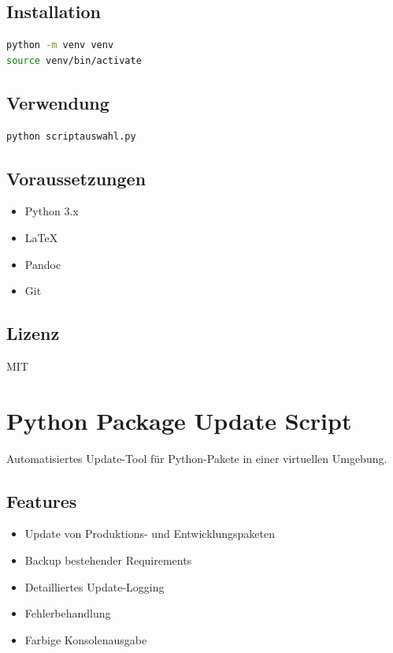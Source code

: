 \documentclass{vorlage-design-main}
\begin{document}
\subsection{Installation}\label{installation}

\begin{lstlisting}[language=bash]
python -m venv venv
source venv/bin/activate
\end{lstlisting}

\subsection{Verwendung}\label{verwendung}

\begin{lstlisting}[language=bash]
python scriptauswahl.py
\end{lstlisting}

\subsection{Voraussetzungen}\label{voraussetzungen}

\begin{itemize}

\item
  Python 3.x
\item
  LaTeX
\item
  Pandoc
\item
  Git
\end{itemize}

\subsection{Lizenz}\label{lizenz}

MIT

\section{Python Package Update
Script}\label{python-package-update-script}

Automatisiertes Update-Tool für Python-Pakete in einer virtuellen
Umgebung.

\subsection{Features}\label{features}

\begin{itemize}

\item
  Update von Produktions- und Entwicklungspaketen
\item
  Backup bestehender Requirements
\item
  Detailliertes Update-Logging
\item
  Fehlerbehandlung
\item
  Farbige Konsolenausgabe
\end{itemize}
\end{document}
